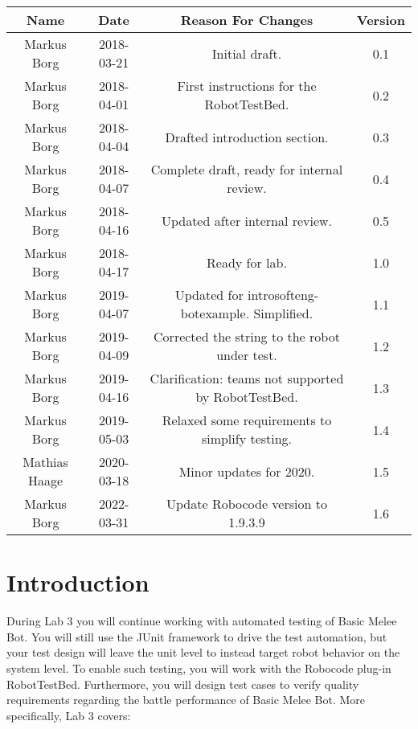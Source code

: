 \documentclass{scrreprt}
\begin{document}
\begin{center}
    \begin{tabular}{|c|c|c|c|}
        \hline
	    Name & Date & Reason For Changes & Version\\
        \hline
	    Markus Borg & 2018-03-21 & Initial draft. & 0.1\\
        \hline
        Markus Borg & 2018-04-01 & First instructions for the RobotTestBed. & 0.2\\
        \hline
        Markus Borg & 2018-04-04 & Drafted introduction section. & 0.3\\
        \hline
        Markus Borg & 2018-04-07 & Complete draft, ready for internal review. & 0.4\\
        \hline
        Markus Borg & 2018-04-16 & Updated after internal review. & 0.5\\
        \hline
        Markus Borg & 2018-04-17 & Ready for lab. & 1.0\\
        \hline
        Markus Borg & 2019-04-07 & Updated for introsofteng-botexample. Simplified. & 1.1\\
        \hline
        Markus Borg & 2019-04-09 & Corrected the string to the robot under test. & 1.2\\
        \hline
        Markus Borg & 2019-04-16 & Clarification: teams not supported by RobotTestBed. & 1.3\\
        \hline
        Markus Borg & 2019-05-03 & Relaxed some requirements to simplify testing. & 1.4\\
        \hline
        Mathias Haage & 2020-03-18 & Minor updates for 2020. & 1.5\\
        \hline
        Markus Borg & 2022-03-31 & Update Robocode version to 1.9.3.9 & 1.6\\
        \hline
    \end{tabular}
\end{center}

\chapter{Introduction}
During Lab 3 you will continue working with automated testing of Basic Melee Bot. You will still use the JUnit framework to drive the test automation, but your test design will leave the unit level to instead target robot behavior on the system level. To enable such testing, you will work with the Robocode plug-in RobotTestBed. Furthermore, you will design test cases to verify quality requirements regarding the battle performance of Basic Melee Bot. More specifically, Lab 3 covers:
\end{document}
